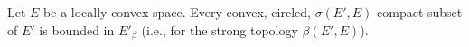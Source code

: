Let $E$ be a locally convex space. Every convex, circled, $\sigma(E', E)$-compact subset of $E'$ is bounded in $E'_\beta$ (i.e., for the strong topology $\beta(E', E)$).
